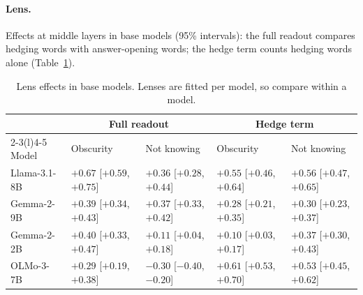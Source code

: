 \documentclass[letterpaper]{article} %
\begin{document}
\paragraph{Lens.}
Effects at middle layers in base models (95\% intervals): the full readout compares hedging words with answer-opening words; the hedge term counts hedging words alone (Table~\ref{tab:lens}).

\begin{table}[!ht]
\centering
\small
\begin{tabular}{@{}lllll@{}}
\toprule
 & \multicolumn{2}{c}{Full readout} & \multicolumn{2}{c}{Hedge term} \\
\cmidrule(lr){2-3}\cmidrule(l){4-5}
Model & Obscurity & Not knowing & Obscurity & Not knowing \\
\midrule
Llama-3.1-8B & $+0.67$ [$+0.59$, $+0.75$] & $+0.36$ [$+0.28$, $+0.44$] & $+0.55$ [$+0.46$, $+0.64$] & $+0.56$ [$+0.47$, $+0.65$] \\
Gemma-2-9B & $+0.39$ [$+0.34$, $+0.43$] & $+0.37$ [$+0.33$, $+0.42$] & $+0.28$ [$+0.21$, $+0.35$] & $+0.30$ [$+0.23$, $+0.37$] \\
Gemma-2-2B & $+0.40$ [$+0.33$, $+0.47$] & $+0.11$ [$+0.04$, $+0.18$] & $+0.10$ [$+0.03$, $+0.17$] & $+0.37$ [$+0.30$, $+0.43$] \\
OLMo-3-7B & $+0.29$ [$+0.19$, $+0.38$] & $-0.30$ [$-0.40$, $-0.20$] & $+0.61$ [$+0.53$, $+0.70$] & $+0.53$ [$+0.45$, $+0.62$] \\
\bottomrule
\end{tabular}
\caption{Lens effects in base models. Lenses are fitted per model, so compare within a model.}
\label{tab:lens}
\end{table}
\end{document}

